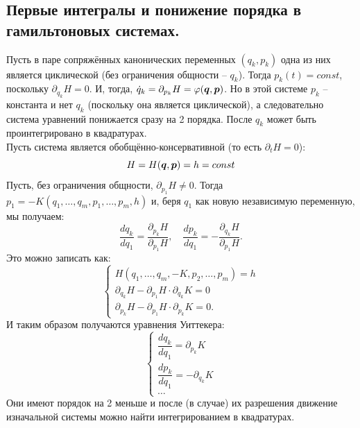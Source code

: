 \subsection{Первые интегралы и понижение порядка в гамильтоновых системах.}
Пусть в паре сопряжённых канонических переменных $(q_k, p_k)$ одна из них является циклической (без ограничения общности -- $q_k$). Тогда $p_k(t) = const$, поскольку $\partial_{q_k}H = 0$.
И, тогда, $\dot{q}_k = \partial_{p_k}H = \varphi(\boldsymbol{q}, \boldsymbol{p})$.
Но в этой системе $p_k$ -- константа и нет $q_k$ (поскольку она является циклической), а следовательно система уравнений понижается сразу на 2 порядка.
После $q_k$ может быть проинтегрировано в квадратурах. \\
Пусть система является обобщённо-консервативной (то есть $\partial_t H = 0$):
\[
    H = H(\boldsymbol{q}, \boldsymbol{p}) = h = const
\]
Пусть, без ограничения общности, $\partial_{p_1}H \neq 0$.
Тогда $p_1 = -K(q_1, \ldots, q_m, p_1, \ldots, p_m, h)$ и, беря $q_1$ как новую независимую переменную, мы получаем:
\[
    \dfrac{d q_k}{d q_1} = \dfrac{\partial_{p_k} H}{\partial_{p_1} H}, \quad \dfrac{d p_k}{d q_1} = - \dfrac{\partial_{q_k} H}{\partial_{p_1} H}.
\]
Это можно записать как:
\begin{equation*}
    \begin{cases}
        H(q_1, \ldots, q_m, -K, p_2, \ldots, p_m) = h \\
        \partial_{q_k} H - \partial_{p_1} H \cdot \partial_{q_k} K = 0 \\
        \partial_{p_k} H - \partial_{p_1} H \cdot \partial_{p_k} K = 0.
    \end{cases}
\end{equation*}
И таким образом получаются уравнения Уиттекера:
\begin{equation*}
    \begin{cases}
        \dfrac{d q_k}{d q_1} = \partial_{p_k} K \\
        \dfrac{d p_k}{d q_1} = - \partial_{q_k} K \\
        \ldots
    \end{cases}
\end{equation*}
Они имеют порядок на 2 меньше и после (в случае) их разрешения движение изначальной системы можно найти интегрированием в квадратурах. \\
